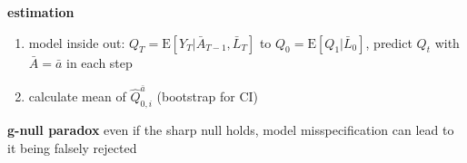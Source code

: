 \documentclass[8pt,oneside]{extarticle}
\begin{document}
\begin{multicols}{2}
{\begin{minipage}{28em}


\begin{mdframed}[linecolor=black!20!,
    outerlinewidth=0.2pt,
    innertopmargin=0.5\baselineskip,
    innerbottommargin=0.5\baselineskip,
    backgroundcolor=lightgray!20!white, innerleftmargin=2pt, innerrightmargin=2pt]
\textbf{estimation} \citep{schomaker_using_2019}

\begin{enumerate}[itemsep=0em, topsep=0pt, partopsep=0pt,parsep=0pt, leftmargin=1.5em]
\setlength{\itemsep}{0pt}%
\setlength{\parskip}{0pt}
\item model inside out: $Q_{T} {=} \mathrm{E} \left[Y_T| \bar{A}_{T{-}1}, \bar{L}_T \right]$ to $Q_0 {=} \mathrm{E} \left[Q_1| \bar{L}_0 \right]$, predict $Q_t$ with $\bar{A} = \bar{a}$ in each step
\item calculate mean of $\hat{Q}_{0,i}^{\bar{a}}$ (bootstrap for CI)
\end{enumerate}



\end{mdframed}

\noindent \textbf{g-null paradox} even if the sharp null holds, model misspecification can lead to it being falsely rejected

\end{minipage}}




\end{multicols}
\end{document}
